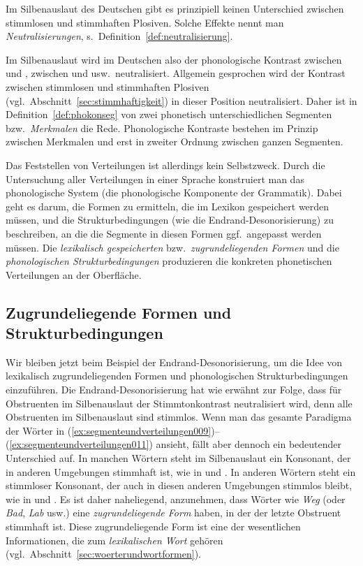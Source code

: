 Im Silbenauslaut des Deutschen gibt es prinzipiell keinen Unterschied zwischen stimmlosen und stimmhaften Plosiven.
Solche Effekte nennt man \textit{Neutralisierungen}, s.\ Definition~\ref{def:neutralisierung}.


Im Silbenauslaut wird im Deutschen also der phonologische Kontrast zwischen \textipa{[g]} und \textipa{[k]}, zwischen \textipa{[d]} und \textipa{[t]} usw.\ neutralisiert.
Allgemein gesprochen wird der Kontrast zwischen stimmlosen und stimmhaften Plosiven (vgl.\ Abschnitt~\ref{sec:stimmhaftigkeit}) in dieser Position neutralisiert.
Daher ist in Definition~\ref{def:phokonseg} von zwei phonetisch unterschiedlichen Segmenten bzw.\ \textit{Merkmalen} die Rede.
Phonologische Kontraste bestehen im Prinzip zwischen Merkmalen und erst in zweiter Ordnung zwischen ganzen Segmenten.

Das Feststellen von Verteilungen ist allerdings kein Selbstzweck.
Durch die Untersuchung aller Verteilungen in einer Sprache konstruiert man das phonologische System (die phonologische Komponente der Grammatik).
Dabei geht es darum, die Formen zu ermitteln, die im Lexikon gespeichert werden müssen, und die Strukturbedingungen (wie die Endrand-Desonorisierung) zu beschreiben, an die die Segmente in diesen Formen ggf.\ angepasst werden müssen.
Die \textit{lexikalisch gespeicherten} bzw.\ \textit{zugrundeliegenden Formen} und die \textit{phonologischen Strukturbedingungen} produzieren die konkreten phonetischen Verteilungen an der Oberfläche.

\subsection{Zugrundeliegende Formen und Strukturbedingungen}
\label{sec:zugrundeliegendeformenundstrukturbedingungen}

Wir bleiben jetzt beim Beispiel der Endrand-Desonorisierung, um die Idee von lexikalisch zugrundeliegenden Formen und phonologischen Strukturbedingungen einzuführen.
Die Endrand-Desonorisierung hat wie erwähnt zur Folge, dass für Obstruenten im Silbenauslaut der Stimmtonkontrast neutralisiert wird, denn alle Obstruenten im Silbenauslaut sind stimmlos.
Wenn man das gesamte Paradigma der Wörter in (\ref{ex:segmenteundverteilungen009})--(\ref{ex:segmenteundverteilungen011}) ansieht, fällt aber dennoch ein bedeutender Unterschied auf.
In manchen Wörtern steht im Silbenauslaut ein Konsonant, der in anderen Umgebungen stimmhaft ist, wie in \textipa{[ve:k]} und \textipa{[ve:g@s]}.
In anderen Wörtern steht ein stimmloser Konsonant, der auch in diesen anderen Umgebungen stimmlos bleibt, wie in \textipa{[bOk]} und \textipa{[bOk@s]}.
Es ist daher naheliegend, anzunehmen, dass Wörter wie \textit{Weg} (oder \textit{Bad}, \textit{Lab} usw.) eine \textit{zugrundeliegende Form} haben, in der der letzte Obstruent stimmhaft ist.
Diese zugrundeliegende Form ist eine der wesentlichen Informationen, die zum \textit{lexikalischen Wort} gehören (vgl.\ Abschnitt~\ref{sec:woerterundwortformen}).

